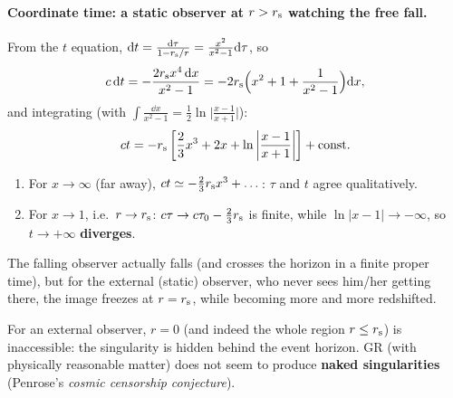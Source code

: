 \paragraph{Coordinate time: a static observer at $r>r_{\mathrm s}$ watching the free fall.} From the $t$ equation, $\mathrm{d} t=\frac{\mathrm{d}\tau}{1-r_{\mathrm s}/r}=\frac{x^2}{x^2-1}\mathrm{d}\tau$, so
\[
  c\,\mathrm{d} t=-\frac{2r_{\mathrm s} x^4\,\mathrm{d} x}{x^2-1}=-2r_{\mathrm s}\Big(x^2+1+\frac{1}{x^2-1}\Big)\mathrm{d} x ,
\]
and integrating (with $\int\frac{\dd x}{x^2-1}=\frac12\ln\big|\frac{x-1}{x+1}\big|$):
\begin{equation}
  ct=-r_{\mathrm s}\left[\frac23x^3+2x+\ln\left|\frac{x-1}{x+1}\right|\right]+\text{const}.
\end{equation}
\begin{enumerate}[label=(\roman*)]
\item For $x\to\infty$ (far away), $ct\simeq-\frac23r_{\mathrm s} x^3+\dots$: $\tau$ and $t$ agree qualitatively.
\item For $x\to1$, i.e.\ $r\to r_{\mathrm s}$: $c\tau\to c\tau_0-\frac23r_{\mathrm s}$ is finite, while $\ln|x-1|\to-\infty$, so $t\to+\infty$ \textbf{diverges}.
\end{enumerate}
The falling observer actually falls (and crosses the horizon in a finite proper time), but for the external (static) observer, who never sees him/her getting there, the image freezes at $r=r_{\mathrm s}$, while becoming more and more redshifted.

\begin{keyresult}
For an external observer, $r=0$ (and indeed the whole region $r\le r_{\mathrm s}$) is inaccessible: the singularity is hidden behind the event horizon. GR (with physically reasonable matter) does not seem to produce \textbf{naked singularities} (Penrose's \emph{cosmic censorship conjecture}).
\end{keyresult}
